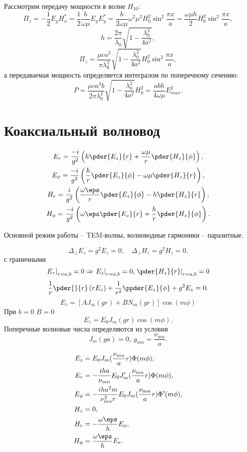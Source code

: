 Рассмотрим передачу мощности в волне \( H_{10} \):
\[
	\Pi_z = -\frac{1}{2}E_y H_x^* = \frac{1}{2}\frac{h}{\omega\mu}E_yE_y^* = \frac{h}{2\omega\mu}\omega^2\mu^2 H_0^2\sin^2\frac{\pi x}{a} = \frac{\omega\mu h}{2}H_0^2\sin^2\frac{\pi x}{a},
\]
\[
	h= \frac{2\pi}{\lambda_0}\sqrt{1 - \frac{\lambda_0^2}{4a^2}},
\]
\[
	\Pi_z = \frac{\mu ca^2}{\pi\lambda_0^2}\sqrt{1 - \frac{\lambda_0^2}{4a^2}}H_0^2\sin^2\frac{\pi x}{a},
\]
а передаваемая мощность определяется интегралом по поперечному сечению:
\[
	P = \frac{\mu ca^3b}{2\pi\lambda_0^2}\sqrt{1 - \frac{\lambda_0^2}{4a^2}}H_0^2 = \frac{abh}{4\omega\mu}E_{max}^2.
\]

\section{Коаксиальный волновод}
\begin{gather*}
	E_r =    \frac{-i}{g^2}\left(h\pder{E_z}{r} + \frac{\omega\mu}{r}\pder{H_z}{\phi}\right),\\
	E_\phi = \frac{-i}{g^2}\left(\frac{h}{r}\pder{E_z}{\phi} - \omega\mu\pder{H_z}{r}\right),\\
	H_r =    \frac{i}{g^2}\left(\frac{\omega\eps}{r}\pder{E_z}{\phi} - h\pder{H_z}{r}\right),\\
	H_\phi = \frac{-i}{g^2}\left(\omega\eps\pder{E_z}{r} + \frac{h}{r}\pder{H_z}{\phi}\right).
\end{gather*}

Основной режим работы -- TEM-волны, волноводные гармоники -- паразитные.

\[
	\Delta_\perp E_z = g^2 E_z = 0,\quad \Delta_\perp H_z = g^2 H_z = 0.
\]
с граничными
\[
	\left.E_\tau\right|_{r=a,b} = 0 \Rightarrow \left.E_z\right|_{r=a,b} = 0, \left.\pder{H_z}{r}\right|_{r=a,b} = 0
\]
\[
	\frac{1}{r}\pder{}{r}\left( rE_z \right) + \frac{1}{r^2}\ppder{E_z}{\phi} + g^2E_z = 0.
\]
\[
	E_z = [AJ_m(gr) + BN_m(gr)]\cos(m\phi)
\]
При \( b = 0 \) \( B = 0 \)
\[
	E_z = E_0J_m(gr)\cos(m\phi).
\]
Поперечные волновые числа определяются из условия
\[
	J_m(ga) = 0,\ g_{mn} = \frac{\nu_{mn}}{a}.
\]

\begin{align*}
	E_z &= E_0 J_m(\frac{\nu_{mn}}{a}r)\Phi(m\phi),\\
	E_r &= -\frac{iha}{\nu_{mn}}E_0 J_m'(\frac{\nu_{mn}}{a}r)\Phi(m\phi),\\
	E_\phi &= -\frac{iha^2m}{\nu_{mn}^2r}E_0 J_m(\frac{\nu_{mn}}{a}r)\Phi'(m\phi),\\
	H_z &= 0,\\
	H_r &= -\frac{\omega\eps}{h}E_\phi,\\
	H_\phi &= \frac{\omega\eps}{h}E_r.
\end{align*}


